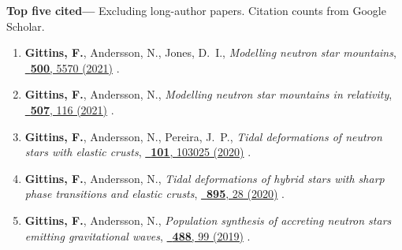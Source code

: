 \textbf{Top five cited---}%
Excluding long-author papers.
Citation counts from Google Scholar.
\begin{enumerate}
    \item \textbf{Gittins, F.}, Andersson, N., Jones, D.~I.,
    \textit{Modelling neutron star mountains},
    \href{https://doi.org/10.1093/mnras/staa3635}%
    {\mnras\ \textbf{500}, 5570 (2021)}
    .
    \item \textbf{Gittins, F.}, Andersson, N.,
    \textit{Modelling neutron star mountains in relativity},
    \href{https://doi.org/10.1093/mnras/stab2048}%
    {\mnras\ \textbf{507}, 116 (2021)}
    .
    \item \textbf{Gittins, F.}, Andersson, N., Pereira, J.~P.,
    \textit{Tidal deformations of neutron stars with elastic crusts},
    \href{https://doi.org/10.1103/PhysRevD.101.103025}%
    {\prd\ \textbf{101}, 103025 (2020)}
    .
    \item \textbf{Gittins, F.}, Andersson, N.,
    \textit{Tidal deformations of hybrid stars with sharp phase transitions and
    elastic crusts},
    \href{https://doi.org/10.3847/1538-4357/ab8aca}%
    {\apj\ \textbf{895}, 28 (2020)}
    .
    \item \textbf{Gittins, F.}, Andersson, N.,
    \textit{Population synthesis of accreting neutron stars emitting
    gravitational waves},
    \href{https://doi.org/10.1093/mnras/stz1719}%
    {\mnras\ \textbf{488}, 99 (2019)}
    .
\end{enumerate}
\else%
\fi


